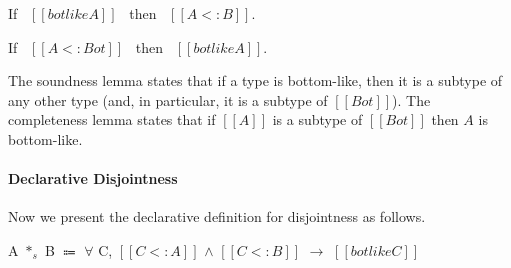 \begin{lemma}
  If \ $[[botlike A]]$ \ then \ $[[A <: B]]$.
\label{lemma:union:bl-soundness}
\end{lemma}

\begin{comment}
\begin{proof}
  By induction on bottom-like relation.
  \begin{itemize}
    \item All cases are trivial to prove.
  \end{itemize}
\end{proof}
\end{comment}

\begin{lemma}
  If \ $[[A <: Bot]]$ \ then \ $[[botlike A]]$.
\label{lemma:union:bl-completeness}
\end{lemma}

\noindent The soundness lemma states that if a type is bottom-like, then it is
a subtype of any other type (and, in particular, it is a subtype of $[[Bot]]$).
The completeness lemma states that if $[[A]]$ is a subtype of $[[Bot]]$ then $A$
is bottom-like.

\begin{comment}
\begin{proof}
  By induction on type $[[A]]$.
  \begin{itemize}
    \item Cases $[[Top]]$, $[[Bot]]$, $[[Int]]$ and $[[A -> B]]$ are trivial to prove.
    \item Case $[[A \/ B]]$ requires \Cref{lemma:union:sub-or}.
  \end{itemize}
\end{proof}
\end{comment}

\paragraph{Declarative Disjointness}
Now we present
the declarative definition for disjointness as follows.

\begin{definition}
  A $*_s$ B $\Coloneqq$ $\forall$ C, $[[C <: A]]$ $\wedge$ $[[C <: B]]$ $\rightarrow$ $[[botlike C]]$
\label{def:union:disj}
\end{definition}

